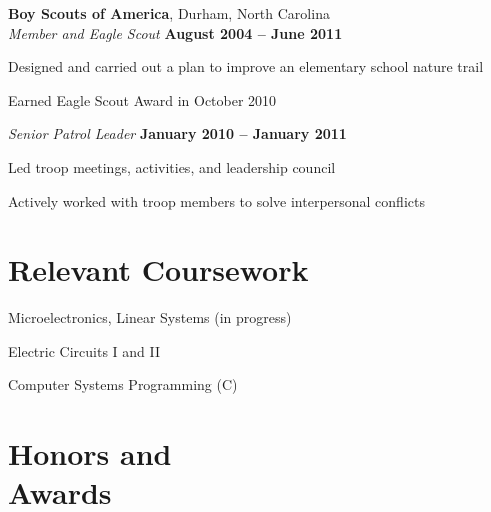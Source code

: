 \documentclass[margin,line,letterpaper]{resume}
\begin{document}
\begin{resume}
    \textbf{Boy Scouts of America}, Durham, North Carolina \vspace{2mm}\\\vspace{1mm}%
    \textsl{Member and Eagle Scout} \hfill \textbf{August 2004 -- June 2011}\vspace{-3mm}\\\vspace{-1mm}%
    \begin{list2}
    \item Designed and carried out a plan to improve an elementary school nature trail
    \item Earned Eagle Scout Award in October 2010
    \end{list2}\vspace{-1.5mm}

    \textsl{Senior Patrol Leader} \hfill \textbf{January 2010 -- January 2011}\vspace{-3mm}\\\vspace{-1mm}%
    \begin{list2}
    \item Led troop meetings, activities, and leadership council
    \item Actively worked with troop members to solve interpersonal conflicts
    \end{list2}\vspace{-1.5mm}


    \section{\mysidestyle Relevant Coursework}

    \begin{list2}
    \item Microelectronics, Linear Systems (in progress)
    \item Electric Circuits I and II
    \item Computer Systems Programming (C)
    \end{list2}\vspace{-1.5mm}


    \section{\mysidestyle Honors and\\Awards}


\end{resume}
\end{document}
